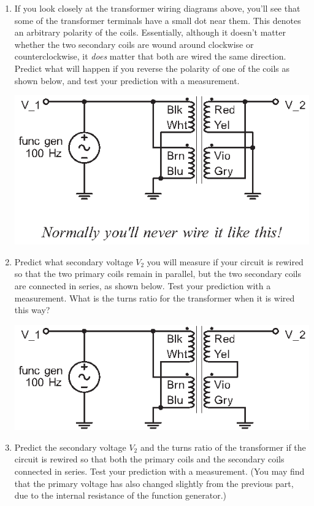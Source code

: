\begin{enumerate}[wide]
\item If you look closely at the transformer wiring diagrams above, you'll see that some of the transformer terminals have a small dot near them.  This denotes an arbitrary polarity of the coils.  Essentially, although it doesn't matter whether the two secondary coils are wound around clockwise or counterclockwise, it \textit{does} matter that both are wired the same direction.  Predict what will happen if you reverse the polarity of one of the coils as shown below, and test your prediction with a measurement.

\begin{center}
\includegraphics{transformers/transformer_par_par_reversed.eps}
\end{center}

\item Predict what secondary voltage $V_2$ you will measure if your circuit is rewired so that the two primary coils remain in parallel, but the two secondary coils are connected in series, as shown below.  Test your prediction with a measurement.  What is the turns ratio for the transformer when it is wired this way?

\begin{center}
\includegraphics{transformers/transformer_par_ser.eps}
\end{center}

\item Predict the secondary voltage $V_2$ and the turns ratio of the transformer if the circuit is rewired so that both the primary coils and the secondary coils connected in series. Test your prediction with a measurement.  (You may find that the primary voltage has also changed slightly from the previous part, due to the internal resistance of the function generator.)


\end{enumerate}
